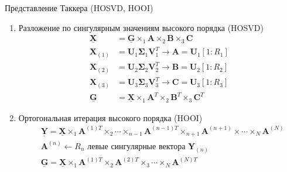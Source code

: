 \documentclass{beamer}
\begin{document}
\begin{frame}{Представление Таккера (HOSVD, HOOI)}

    \begin{enumerate}
        \item Разложение по сингулярным значениям высокого порядка (HOSVD)
            \begin{align*}
                \mathbf{\underline{X}} &= \mathbf{\underline{G}} \times_1 \mathbf{A} \times_2 \mathbf{B} \times_3 \mathbf{C}\\
                \mathbf{X}_{(1)} &= \mathbf{U}_1  \mathbf{\Sigma}_1 \mathbf{V}_1^T \rightarrow \mathbf{A} = \mathbf{U}_1[1:R_1]\\
                \mathbf{X}_{(2)} &= \mathbf{U}_2  \mathbf{\Sigma}_2 \mathbf{V}_2^T \rightarrow \mathbf{B} = \mathbf{U}_2[1:R_2]\\
                \mathbf{X}_{(3)} &= \mathbf{U}_3  \mathbf{\Sigma}_3 \mathbf{V}_3^T \rightarrow \mathbf{C} = \mathbf{U}_3[1:R_3]\\
                \mathbf{\underline{G}} &= \mathbf{\underline{X}} \times_1 \mathbf{A}^T \times_2 \mathbf{B}^T \times_3 \mathbf{C}^T
            \end{align*}
        \item Ортогональная итерация высокого порядка (HOOI)
            \begin{align*}
                &\mathbf{\underline{Y}} = \mathbf{\underline{X}} \times_1 \mathbf{A}^{(1)T} \times_2 \cdots \times_{n-1} \mathbf{A}^{(n-1)T} \times_{n+1} \mathbf{A}^{(n+1)} \times \cdots \times_N \mathbf{A}^{(N)} \\
                &\mathbf{A}^{(n)} \leftarrow R_n \text{ левые сингулярные вектора } \mathbf{Y}_{(n)} \\
                &\mathbf{\underline{G}} = \mathbf{\underline{X}} \times_1 \mathbf{A}^{(1)T}  \times_2 \mathbf{A}^{(2)T} \times_3 \cdots  \times_N \mathbf{A}^{(N)T}
            \end{align*}            
    \end{enumerate}

\end{frame}

\end{document}
